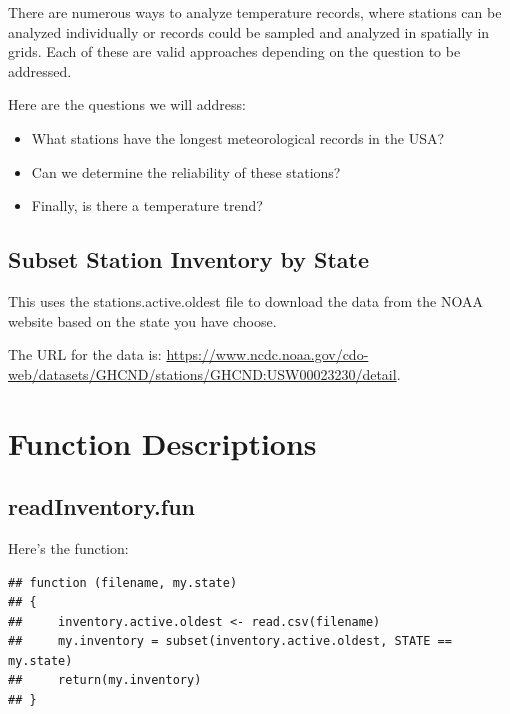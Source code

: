 \documentclass{article}\usepackage[]{graphicx}\usepackage[dvipsnames]{xcolor}
\makeatletter
\newenvironment{kframe}{%
 \def\at@end@of@kframe{}%
 \ifinner\ifhmode%
  \def\at@end@of@kframe{\end{minipage}}%
  \begin{minipage}{\columnwidth}%
 \fi\fi%
 \def\FrameCommand##1{\hskip\@totalleftmargin \hskip-\fboxsep
 \colorbox{shadecolor}{##1}\hskip-\fboxsep
     \hskip-\linewidth \hskip-\@totalleftmargin \hskip\columnwidth}%
 \MakeFramed {\advance\hsize-\width
   \@totalleftmargin\z@ \linewidth\hsize
   \@setminipage}}%
 {\par\unskip\endMakeFramed%
 \at@end@of@kframe}
\newenvironment{knitrout}{}{} %
\makeatother
\begin{document}
There are numerous ways to analyze temperature records, where stations can be analyzed individually or records could be sampled and analyzed in spatially in grids. Each of these are valid approaches depending on the question to be addressed. 

Here are the questions we will address: 

\begin{itemize}
  \item What stations have the longest meteorological records in the USA?
  \item Can we determine the reliability of these stations?
  \item Finally, is there a temperature trend?
\end{itemize}

\subsection{Subset Station Inventory by State}

This uses the stations.active.oldest file to download the data from the NOAA website based on the state you have choose.

The URL for the data is: \url{https://www.ncdc.noaa.gov/cdo-web/datasets/GHCND/stations/GHCND:USW00023230/detail}.

\section{Function Descriptions}



\subsection{readInventory.fun}\label{subsec:readInventory}

Here's the function:

\begin{knitrout}
\color{fgcolor}\begin{kframe}
\begin{verbatim}
## function (filename, my.state) 
## {
##     inventory.active.oldest <- read.csv(filename)
##     my.inventory = subset(inventory.active.oldest, STATE == my.state)
##     return(my.inventory)
## }
\end{verbatim}
\end{kframe}
\end{knitrout}
\end{document}
